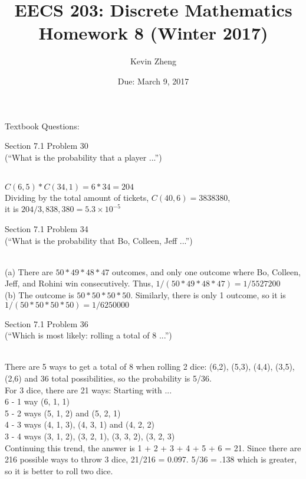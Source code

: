 \documentclass[11pt]{exam}
\begin{document}
\title{ EECS 203: Discrete Mathematics \\
        Homework 8 (Winter 2017)}
\date{Due: March 9, 2017}
\author{Kevin Zheng}

\maketitle

\begin{questions}

{\bf \item[] Textbook Questions:}
\question[2] Section 7.1 Problem 30\\
(“What is the probability that a player ...”) 
\begin{solution}\\
$C(6, 5) * C(34, 1) = 6 * 34 = 204$ \\
Dividing by the total amount of tickets, $C(40, 6) = 3838380$, \\
it is $204 / 3,838,380 = 5.3 \times 10^{-5}$
\end{solution}
\question[4] Section 7.1 Problem 34\\
(“What is the probability that Bo, Colleen, Jeff ...”) 
\begin{solution}\\
(a) There are $50 * 49 * 48 * 47$ outcomes, and only one outcome where Bo, Colleen, Jeff, and Rohini win consecutively. Thus, $1 / (50 * 49 * 48 * 47) = 1/5527200$\\
(b) The outcome is $50 * 50 * 50 * 50$. Similarly, there is only 1 outcome, so it is $1 / (50 * 50 * 50 * 50) = 1/6250000$

\end{solution}
\question[2] Section 7.1 Problem 36\\
(“Which is most likely: rolling a total of 8 ...”) 
\begin{solution}\\
There are 5 ways to get a total of 8 when rolling 2 dice: (6,2), (5,3), (4,4), (3,5), (2,6) and 36 total possibilities, so the probability is 5/36. \\
For 3 dice, there are 21 ways: 
Starting with ... \\
6 - 1 way (6, 1, 1) \\
5 - 2 ways (5, 1, 2) and (5, 2, 1)\\
4 - 3 ways (4, 1, 3), (4, 3, 1) and (4, 2, 2)\\
3 - 4 ways (3, 1, 2), (3, 2, 1), (3, 3, 2), (3, 2, 3)\\
Continuing this trend, the answer is 1 + 2 + 3 + 4 + 5 + 6 = 21. Since there are 216 possible ways to throw 3 dice, 21/216 = 0.097. 5/36 = .138 which is greater, so it is better to roll two dice.


\end{solution}
\end{questions}
\end{document}
